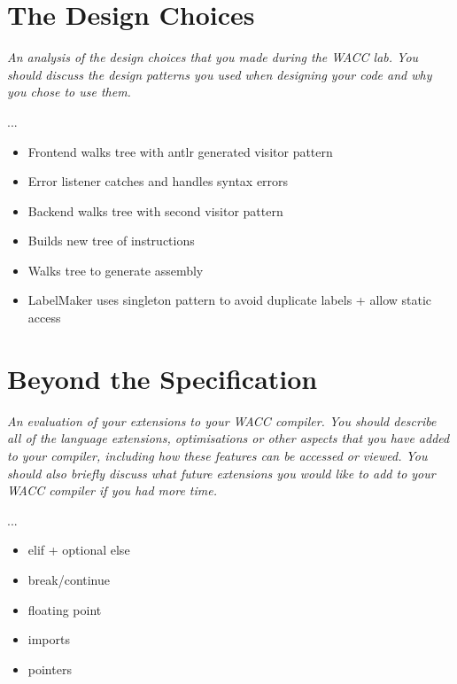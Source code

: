 \documentclass[]{article}
\newcommand{\spec}[1]{\textit{#1}\par\noindent}
\begin{document}
\section{The Design Choices}
\spec{An analysis of the design choices that you made during the WACC lab. You should discuss the design patterns you used when designing your code and why you chose to use them.}
...
\begin{itemize}
\item Frontend walks tree with antlr generated visitor pattern
\item Error listener catches and handles syntax errors
\item Backend walks tree with second visitor pattern
\item Builds new tree of instructions
\item Walks tree to generate assembly
\item LabelMaker uses singleton pattern to avoid duplicate labels + allow static access
\end{itemize}

\section{Beyond the Specification}
\spec{An evaluation of your extensions to your WACC compiler. You should describe all of the language extensions, optimisations or other aspects that you have added to your compiler, including how these features can be accessed or viewed. You should also briefly discuss what future extensions you would like to add to your WACC compiler if you had more time.}
...
\begin{itemize}
\item elif + optional else
\item break/continue
\item floating point
\item imports
\item pointers
\end{itemize}
\end{document}
